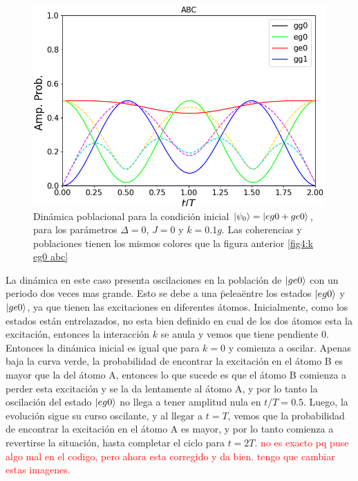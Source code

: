 \begin{figure}[h]
    \begin{minipage}[c]{0.67\textwidth}
        \includegraphics[width=\textwidth]{figuras/ch4/k eg0+ ABC.png}
    \end{minipage}\hfill
    \begin{minipage}[c]{0.3\textwidth}
    \caption{Dinámica poblacional para la condición inicial $\ket{\psi_0}=\ket{eg0+ge0}$, para los parámetros $\Delta=0$, $J=0$ y $k=0.1g$. Las coherencias y poblaciones tienen los mismos colores que la figura anterior \ref{fig4:k eg0 abc}
         } \label{fig4:k eg0 sim abc}
  \end{minipage}
\end{figure}
La dinámica en este caso presenta oscilaciones en la población de $\ket{ge0}$ con un periodo dos veces mas grande. Esto se debe a una \"pelea\" entre los estados $\ket{eg0}$ y $\ket{ge0}$, ya que tienen las excitaciones en diferentes átomos. Inicialmente, como los estados están entrelazados, no esta bien definido en cual de los dos átomos esta la excitación, entonces la interacción $k$ se anula y vemos que tiene pendiente 0. Entonces la dinámica inicial es igual que para $k=0$ y comienza a oscilar. Apenas baja la curva verde, la probabilidad de encontrar la excitación en el átomo B es mayor que la del átomo A, entonces lo que sucede es que el átomo B comienza a perder esta excitación y se la da lentamente al átomo A, y por lo tanto la oscilación del estado $\ket{eg0}$ no llega a tener amplitud nula en $t/T=0.5$. Luego, la evolución sigue su curso oscilante, y al llegar a $t=T$, vemos que la probabilidad de encontrar la excitación en el átomo A es mayor, y por lo tanto comienza a revertirse la situación, hasta completar el ciclo para $t=2T$. \textcolor{red}{no es exacto pq puse algo mal en el codigo, pero ahora esta corregido y da bien. tengo que cambiar estas imagenes.} 

